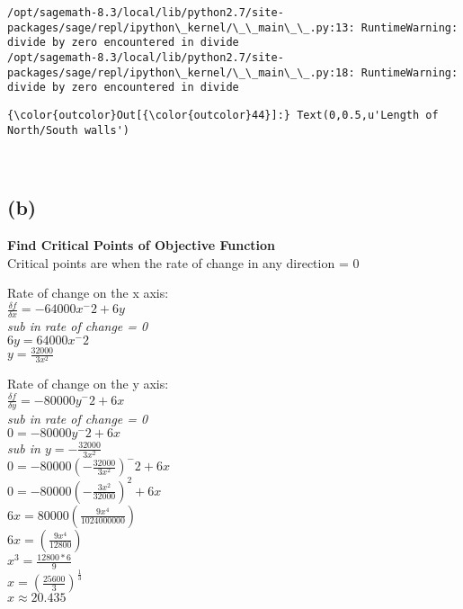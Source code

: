 \documentclass[11pt]{article}
\begin{document}
    \begin{Verbatim}[commandchars=\\\{\}]
/opt/sagemath-8.3/local/lib/python2.7/site-packages/sage/repl/ipython\_kernel/\_\_main\_\_.py:13: RuntimeWarning: divide by zero encountered in divide
/opt/sagemath-8.3/local/lib/python2.7/site-packages/sage/repl/ipython\_kernel/\_\_main\_\_.py:18: RuntimeWarning: divide by zero encountered in divide

    \end{Verbatim}

\begin{Verbatim}[commandchars=\\\{\}]
{\color{outcolor}Out[{\color{outcolor}44}]:} Text(0,0.5,u'Length of North/South walls')
\end{Verbatim}
            
    \begin{center}
    \end{center}
    { \hspace*{\fill} \\}
    
    \subsection{(b)}\label{b}

    \textbf{Find Critical Points of Objective Function}\\
Critical points are when the rate of change in any direction = 0

Rate of change on the x axis:\\
\(\frac{\delta f}{\delta x} = -64000x^-2 + 6y\)\\
\emph{sub in rate of change = 0}\\
\(6y = 64000x^-2\)\\
\(y = \frac {32000}{3x^2}\)

Rate of change on the y axis:\\
\(\frac{\delta f}{\delta y} = -80000y^-2 + 6x\)\\
\emph{sub in rate of change = 0}\\
\(0 = -80000y^-2 + 6x\)\\
\emph{sub in \(y = -\frac {32000}{3x^2}\)}\\
\(0 = -80000(-\frac {32000}{3x^2})^-2 + 6x\)\\
\(0 = -80000(-\frac {3x^2}{32000})^2 + 6x\)\\
\(6x = 80000(\frac {9x^4}{1024000000})\)\\
\(6x = (\frac {9x^4}{12800})\)\\
\(x^3 = \frac{12800*6}{9}\)\\
\(x =(\frac{25600}{3})^\frac{1}{3}\)\\
\(x \approx 20.435\)
\end{document}
